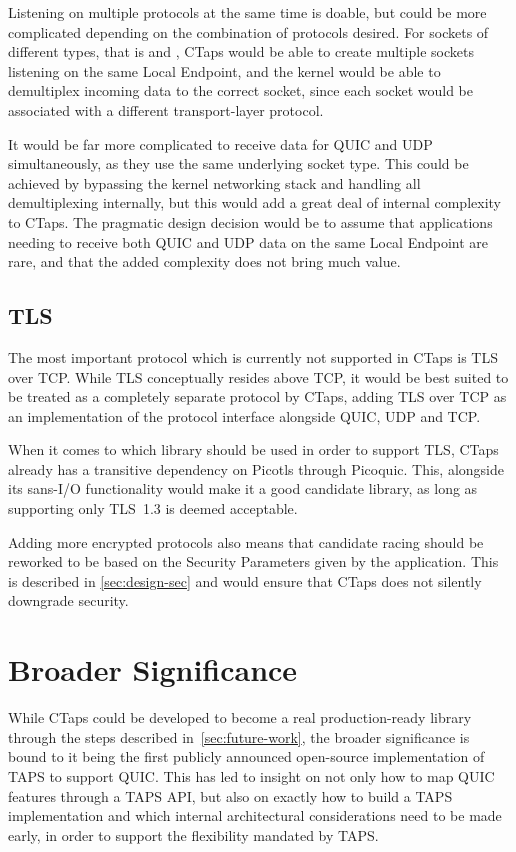 Listening on multiple protocols at the
same time is doable, but could be more complicated depending
on the combination of protocols desired. For sockets of different types, that
is  and , CTaps would be
able to create multiple sockets listening on the same Local Endpoint,
and the kernel would be able to demultiplex incoming data to the
correct socket, since each socket would be associated
with a different transport-layer protocol.

It would be far more complicated to receive data for
QUIC and UDP simultaneously, as they use the same underlying
socket type.
This could be achieved by bypassing
the kernel networking stack and
handling all demultiplexing internally,
but this would add a great deal of internal complexity to CTaps. The
pragmatic design decision would be to assume that
applications needing to receive both QUIC and UDP data on the
same Local Endpoint are rare, and that the added complexity
does not bring much value.

\subsection{TLS}\label{sec:future-work-tls}
The most important protocol which is currently not supported
in CTaps is TLS over TCP. While TLS conceptually resides
above TCP, it would be best suited to be treated as a completely separate
protocol by CTaps, adding TLS over TCP as an implementation of the protocol interface
alongside QUIC, UDP and TCP.

When it comes to which library should be used in order to
support TLS, CTaps already has a transitive dependency on
Picotls through Picoquic. This, alongside its sans-I/O functionality
would make it a good candidate library, as long as supporting
only TLS~1.3 is deemed acceptable.

Adding more encrypted protocols
also means that candidate racing should be reworked to be
based on the Security Parameters given by the application.
This is described in \cref{sec:design-sec} and would ensure
that CTaps does not silently downgrade security.

\section{Broader Significance}
While CTaps could be developed to become a real production-ready library
through the steps described in~\cref{sec:future-work}, the broader
significance is bound to it being the first
publicly announced open-source implementation of TAPS to support QUIC.
This has led to insight on not only how to map
QUIC features through a TAPS API, but also on exactly how to build a TAPS
implementation and which internal architectural considerations need to
be made early, in order to support the flexibility mandated by TAPS.

